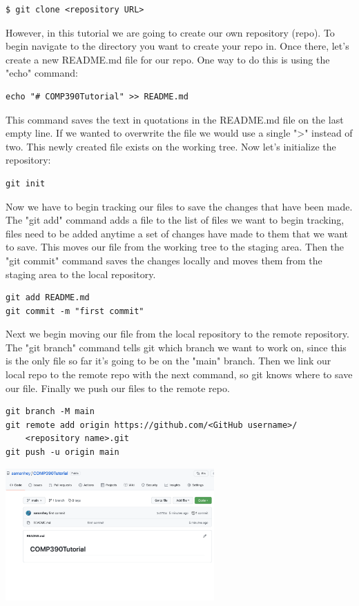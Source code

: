 \documentclass{article}
\begin{document}
\begin{verbatim}
$ git clone <repository URL>
\end{verbatim}

However, in this tutorial we are going to create our own repository (repo). To begin navigate to the directory you want to create your repo in.
Once there, let's create a new README.md file for our repo.
One way to do this is using the "echo" command:

\begin{verbatim}
echo "# COMP390Tutorial" >> README.md
\end{verbatim}

This command saves the text in quotations in the README.md file on the last empty line. If we wanted to overwrite the file we would use a single ">" instead of two. This newly created file exists on the working tree. Now let's initialize the repository:

\begin{verbatim}
git init
\end{verbatim}

Now we have to begin tracking our files to save the changes that have been made. The "git add" command adds a file to the list of files we want to begin tracking, files need to be added anytime a set of changes have made to them that we want to save. This moves our file from the working tree to the staging area. Then the "git commit" command saves the changes locally and moves them from the staging area to the local repository.

\begin{verbatim}
git add README.md
git commit -m "first commit"
\end{verbatim}

Next we begin moving our file from the local repository to the remote repository. The "git branch" command tells git which branch we want to work on, since this is the only file so far it's going to be on the "main" branch. Then we link our local repo to the remote repo with the next command, so git knows where to save our file. Finally we push our files to the remote repo.
\begin{verbatim}
git branch -M main
git remote add origin https://github.com/<GitHub username>/
    <repository name>.git
git push -u origin main
\end{verbatim}

\begin{center}
    \includegraphics[width=8cm]{RepoReadme1.png}
\end{center}
\end{document}

